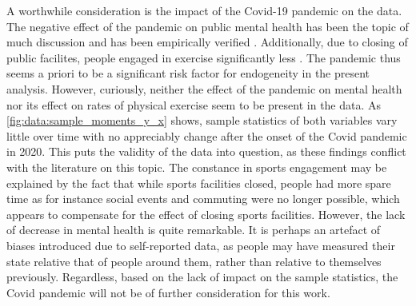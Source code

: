 A worthwhile consideration is the impact of the Covid-19 pandemic on the data. The negative effect of the pandemic on public
mental health has been the topic of much discussion \cite{cullen2020mental,kumar2021covid} and has been empirically verified \cite{kupcova2023effects}.
Additionally, due to closing of public facilites, people engaged in exercise significantly less \cite{amini2021covid}.
The pandemic thus seems a priori to be a significant risk factor for endogeneity in the present analysis.
However, curiously, neither the effect of the pandemic on mental health nor its effect on rates of physical exercise
seem to be present in the data. As \cref{fig:data:sample_moments_y_x} shows, sample statistics of both variables
vary little over time with no appreciably change after the onset of the Covid pandemic in 2020.
This puts the validity of the data into question, as these findings conflict with the literature on this topic.
The constance in sports engagement may be explained by the fact that while sports facilities closed, people had more spare time
as for instance social events and commuting were no longer possible, which appears to compensate for the effect of
closing sports facilities.
However, the lack of decrease in mental health is quite remarkable. It is perhaps an artefact of biases introduced
due to self-reported data, as people may have measured their state relative that of people around them, rather than
relative to themselves previously.
Regardless, based on the lack of impact on the sample statistics, the Covid pandemic will not be of further consideration
for this work.

\begin{figure}[htbp]
    \centering
    \caption{Distributions of the MHI5-score and sports engagement across years}
    \label{fig:data:sample_moments_y_x}
    \begin{subfigure}[t]{0.49\textwidth}
        
        \vspace{0.1em}
    \end{subfigure}
    \hfill
    \begin{subfigure}[t]{0.49\textwidth}
        
        \vspace{0.1em}
    \end{subfigure}
\end{figure}

